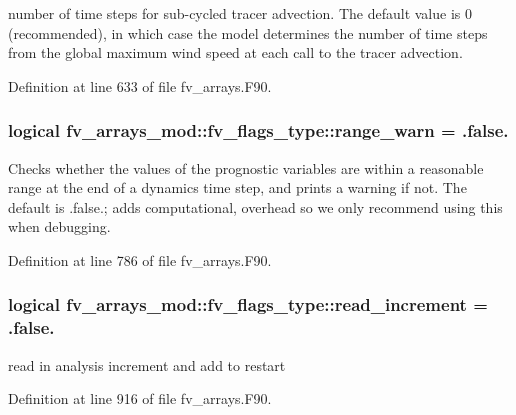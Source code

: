 number of time steps for sub-\/cycled tracer advection. The default value is 0 (recommended), in which case the model determines the number of time steps from the global maximum wind speed at each call to the tracer advection. 



Definition at line 633 of file fv\-\_\-arrays.\-F90.

\subsubsection[{range\-\_\-warn}]{\setlength{\rightskip}{0pt plus 5cm}logical fv\-\_\-arrays\-\_\-mod\-::fv\-\_\-flags\-\_\-type\-::range\-\_\-warn = .false.}\label{structfv__arrays__mod_1_1fv__flags__type_a1aad6b4b7d136e69a2ceadbf8ce7a72e}


Checks whether the values of the prognostic variables are within a reasonable range at the end of a dynamics time step, and prints a warning if not. The default is .false.; adds computational, overhead so we only recommend using this when debugging. 



Definition at line 786 of file fv\-\_\-arrays.\-F90.

\subsubsection[{read\-\_\-increment}]{\setlength{\rightskip}{0pt plus 5cm}logical fv\-\_\-arrays\-\_\-mod\-::fv\-\_\-flags\-\_\-type\-::read\-\_\-increment = .false.}\label{structfv__arrays__mod_1_1fv__flags__type_ac196d8079631a973acd89c9137e2b7be}


read in analysis increment and add to restart 



Definition at line 916 of file fv\-\_\-arrays.\-F90.

